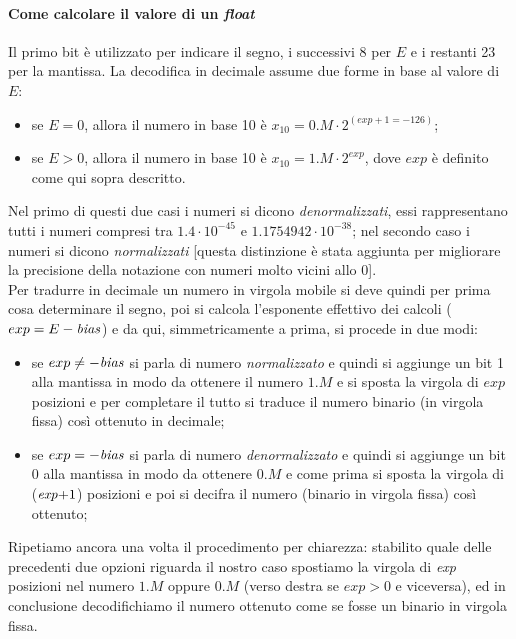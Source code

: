 \documentclass[class=book, crop=false, oneside]{standalone}
\begin{document}
\paragraph{Come calcolare il valore di un \emph{float}} Il primo bit è utilizzato per indicare il segno, i successivi 8 per $E$ e i restanti 23 per la mantissa. La decodifica in decimale assume due forme in base al valore di $E$:
\begin{itemize}[noitemsep,nolistsep]
	\item se $E=0$, allora il numero in base 10 è $x_{10}=0.M \cdot 2^{(exp+1=-126)}$;
	\item se $E>0$, allora il numero in base 10 è $x_{10}=1.M \cdot 2^{exp}$, dove $exp$ è definito come qui sopra descritto.
\end{itemize}
Nel primo di questi due casi i numeri si dicono \emph{denormalizzati}, essi rappresentano tutti i numeri compresi tra \(1.4\cdot10^{-45}\) e \(1.1754942\cdot10^{-38}\); nel secondo caso i numeri si dicono \emph{normalizzati} [questa distinzione è stata aggiunta per migliorare la precisione della notazione con numeri molto vicini allo 0].\\
Per tradurre in decimale un numero in virgola mobile si deve quindi per prima cosa determinare il segno, poi si calcola l'esponente effettivo dei calcoli ($exp=E-\text{\emph{bias}}$) e da qui, simmetricamente a prima, si procede in due modi: \\
\begin{itemize}[noitemsep,nolistsep]
	\item se $exp\neq-\text{\emph{bias}}$ si parla di numero \emph{normalizzato} e quindi si aggiunge un bit 1 alla mantissa in modo da ottenere il numero $1.M$ e si sposta la virgola di $exp$ posizioni e per completare il tutto si traduce il numero binario (in virgola fissa) così ottenuto in decimale;
	\item se $exp=-\text{\emph{bias}}$ si parla di numero \emph{denormalizzato} e quindi si aggiunge un bit 0 alla mantissa in modo da ottenere $0.M$ e come prima si sposta la virgola di ($\text{\emph{exp}+1}$) posizioni e poi si decifra il numero (binario in virgola fissa) così ottenuto;
\end{itemize}

Ripetiamo ancora una volta il procedimento per chiarezza: stabilito quale delle precedenti due opzioni riguarda il nostro caso spostiamo la virgola di \emph{exp} posizioni nel numero $1.M$ oppure $0.M$ (verso destra se $exp>0$ e viceversa), ed in conclusione decodifichiamo il numero ottenuto come se fosse un binario in virgola fissa.\\
\end{document}
